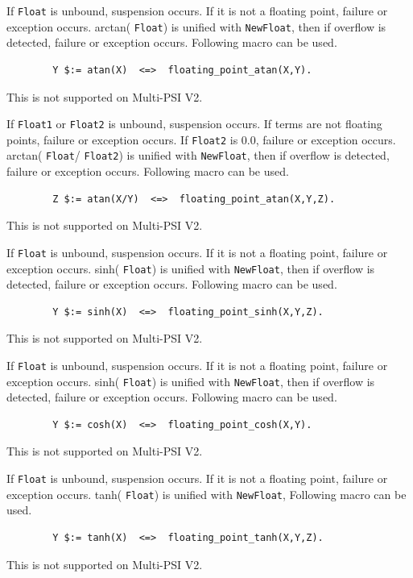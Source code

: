 \begin{itemize}
If \verb|Float| is unbound, suspension occurs.
If it is not a floating point, failure or exception occurs.
arctan( \verb|Float|) is unified with \verb|NewFloat|,
then if overflow is detected, failure or exception occurs.
Following macro can be used.
\begin{verbatim}
        Y $:= atan(X)  <=>  floating_point_atan(X,Y).
\end{verbatim}
\Caution This is not supported on Multi-PSI V2.

If \verb|Float1| or \verb|Float2| is unbound, suspension occurs.
If terms are not floating points, failure or exception occurs.
If \verb|Float2| is 0.0, failure or exception occurs.
arctan( \verb|Float|/ \verb|Float2|) is unified with \verb|NewFloat|,
then if overflow is detected, failure or exception occurs.
Following macro can be used.
\begin{verbatim}
        Z $:= atan(X/Y)  <=>  floating_point_atan(X,Y,Z).
\end{verbatim}
\Caution This is not supported on Multi-PSI V2.

If \verb|Float| is unbound, suspension occurs.
If it is not a floating point, failure or exception occurs.
sinh( \verb|Float|) is unified with \verb|NewFloat|,
then if overflow is detected, failure or exception occurs.
Following macro can be used.
\begin{verbatim}
        Y $:= sinh(X)  <=>  floating_point_sinh(X,Y,Z).
\end{verbatim}
\Caution This is not supported on Multi-PSI V2.

If \verb|Float| is unbound, suspension occurs.
If it is not a floating point, failure or exception occurs.
sinh( \verb|Float|) is unified with \verb|NewFloat|,
then if overflow is detected, failure or exception occurs.
Following macro can be used.
\begin{verbatim}
        Y $:= cosh(X)  <=>  floating_point_cosh(X,Y).
\end{verbatim}
\Caution This is not supported on Multi-PSI V2.

If \verb|Float| is unbound, suspension occurs.
If it is not a floating point, failure or exception occurs.
tanh( \verb|Float|) is unified with \verb|NewFloat|,
Following macro can be used.
\begin{verbatim}
        Y $:= tanh(X)  <=>  floating_point_tanh(X,Y,Z).
\end{verbatim}
\Caution This is not supported on Multi-PSI V2.

\end{itemize}
